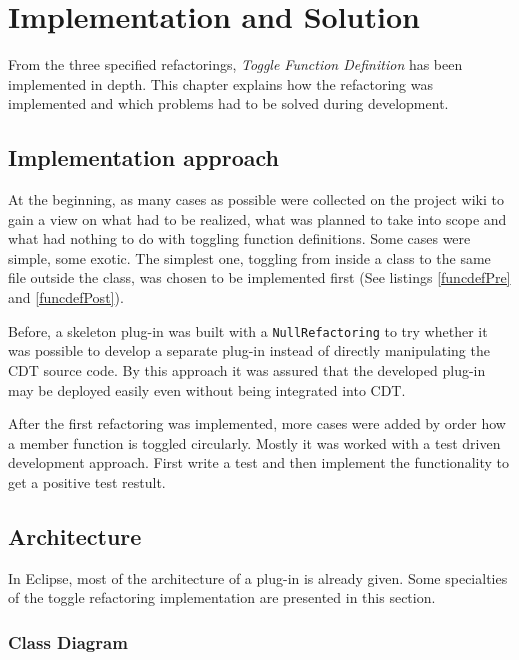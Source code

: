 \chapter{Implementation and Solution}
\thispagestyle{fancy}

From the three specified refactorings, \textit{Toggle Function Definition} has 
been implemented in depth. This chapter explains how the refactoring was 
implemented and which problems had to be solved during development.

\section{Implementation approach}

At the beginning, as many cases as possible were collected on the project wiki 
to gain a view on what had to be realized, what was planned to take into scope 
and what had nothing to do with toggling function definitions. Some cases were 
simple, some exotic. The simplest one, toggling from inside a class to the same 
file outside the class, was chosen to be implemented first (See listings 
\ref{funcdefPre} and \ref{funcdefPost}). 

Before, a skeleton plug-in was built with a \texttt{NullRefactoring} to try
whether it was possible to develop a separate plug-in instead of directly
manipulating the CDT source code. By this approach it was assured that the
developed plug-in may be deployed easily even without being integrated into CDT.

After the first refactoring was implemented, more cases were added by order how
a member function is toggled circularly. Mostly it was worked with a test
driven development approach. First write a test and then implement the
functionality to get a positive test restult.

\section{Architecture}

In Eclipse, most of the architecture of a plug-in is already given. Some
specialties of the toggle refactoring implementation are presented in this
section.

\subsection{Class Diagram}

